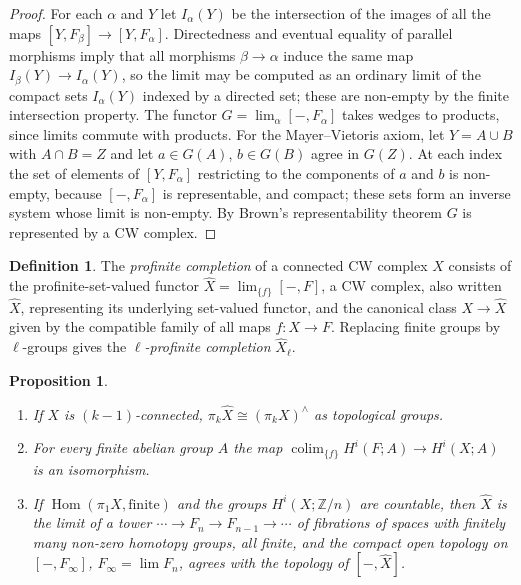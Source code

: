 \documentclass[11pt]{amsart}
\theoremstyle{plain}
\newtheorem{proposition}[theorem]{Proposition}
\theoremstyle{definition}
\newtheorem{definition}[theorem]{Definition}
\numberwithin{equation}{section}
\newcommand{\Z}{\mathbb{Z}}
\newcommand{\hX}{\widehat{X}}
\DeclareMathOperator{\colim}{colim}
\begin{document}
\begin{proof}
For each $\alpha$ and $Y$ let $I_\alpha(Y)$ be the intersection of the images of all the maps $[Y,F_\beta]\to[Y,F_\alpha]$.
Directedness and eventual equality of parallel morphisms imply that all morphisms $\beta\to\alpha$ induce the same map $I_\beta(Y)\to I_\alpha(Y)$, so the limit may be computed as an ordinary limit of the compact sets $I_\alpha(Y)$ indexed by a directed set; these are non-empty by the finite intersection property.
The functor $G=\lim_\alpha[-,F_\alpha]$ takes wedges to products, since limits commute with products.
For the Mayer--Vietoris axiom, let $Y=A\cup B$ with $A\cap B=Z$ and let $a\in G(A)$, $b\in G(B)$ agree in $G(Z)$.
At each index the set of elements of $[Y,F_\alpha]$ restricting to the components of $a$ and $b$ is non-empty, because $[-,F_\alpha]$ is representable, and compact; these sets form an inverse system whose limit is non-empty.
By Brown's representability theorem $G$ is represented by a CW complex.
\end{proof}

\begin{definition}
The \emph{profinite completion} of a connected CW complex $X$ consists of the profinite-set-valued functor $\hX=\lim_{\{f\}}[-,F]$, a CW complex, also written $\hX$, representing its underlying set-valued functor, and the canonical class $X\to\hX$ given by the compatible family of all maps $f\colon X\to F$.
Replacing finite groups by $\ell$-groups gives the \emph{$\ell$-profinite completion} $\hX_\ell$.
\end{definition}

\begin{proposition}\label{prop:completionbasic}
\begin{enumerate}[label=\textup{(\arabic*)}]
\item If $X$ is $(k-1)$-connected, $\pi_k\hX\cong(\pi_kX)^\wedge$ as topological groups.
\item For every finite abelian group $A$ the map $\colim_{\{f\}}H^i(F;A)\to H^i(X;A)$ is an isomorphism.
\item If $\operatorname{Hom}(\pi_1X,\text{finite})$ and the groups $H^i(X;\Z/n)$ are countable, then $\hX$ is the limit of a tower $\cdots\to F_n\to F_{n-1}\to\cdots$ of fibrations of spaces with finitely many non-zero homotopy groups, all finite, and the compact open topology on $[-,F_\infty]$, $F_\infty=\lim F_n$, agrees with the topology of $[-,\hX]$.
\end{enumerate}
\end{proposition}
\end{document}
